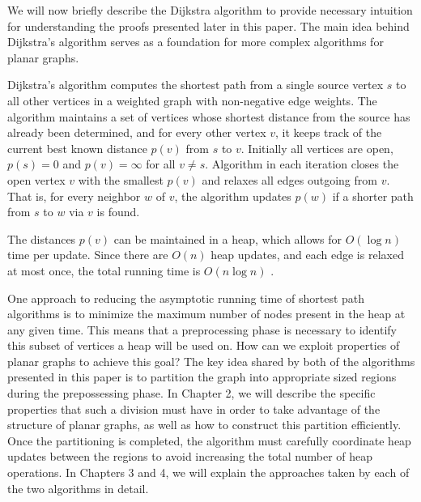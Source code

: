 We will now briefly describe the Dijkstra algorithm to provide necessary intuition for understanding the proofs presented later in this paper. The main idea behind Dijkstra's algorithm serves as a foundation for more complex algorithms for planar graphs.

Dijkstra's algorithm computes the shortest path from a single source vertex $s$ to all other vertices in a weighted graph with non-negative edge weights. The algorithm maintains a set of vertices whose shortest distance from the source has already been determined, and for every other vertex $v$, it keeps track of the current best known distance $p(v)$ from $s$ to $v$.
Initially all vertices are open, $p(s) = 0$ and $p(v) = \infty$ for all $v \neq s$. Algorithm in each iteration closes the open vertex $v$ with the smallest $p(v)$ and relaxes all edges outgoing from $v$. That is, for every neighbor $w$ of $v$, the algorithm updates $p(w)$ if a shorter path from $s$ to $w$ via $v$ is found.

The distances $p(v)$ can be maintained in a heap, which allows for $O(\log n)$ time per update. Since there are $O(n)$ heap updates, and each edge is relaxed at most once, the total running time is $O(n \log n)$ \cite{dijkstraBound}.

One approach to reducing the asymptotic running time of shortest path algorithms is to minimize the maximum number of nodes present in the heap at any given time. This means that a preprocessing phase is necessary to identify this subset of vertices a heap will be used on. How can we exploit properties of planar graphs to achieve this goal? The key idea shared by both of the algorithms presented in this paper is to partition the graph into appropriate sized regions during the prepossessing phase. In Chapter 2, we will describe the specific properties that such a division must have in order to take advantage of the structure of planar graphs, as well as how to construct this partition efficiently. Once the partitioning is completed, the algorithm must carefully coordinate heap updates between the regions to avoid increasing the total number of heap operations. In Chapters 3 and 4, we will explain the approaches taken by each of the two algorithms in detail.

